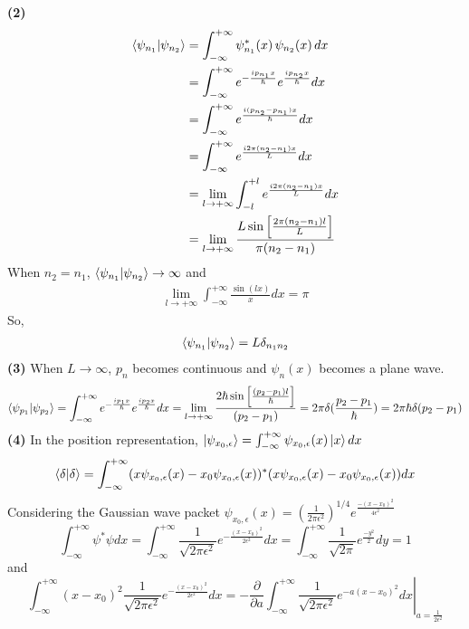 \documentclass[12pt]{article}
\begin{document}
\vspace{1em}
\textbf{(2)} 
\begin{align*}
    \braket{\psi_{n_1} | \psi_{n_2}} &= \int_{-\infty}^{+\infty} \psi_{n_1}^*(x)\, \psi_{n_2}(x) \, dx \\
    &= \int_{-\infty}^{+\infty} e^{-\frac{i p_{n_1} x}{\hbar}} e^{\frac{i p_{n_2} x}{\hbar}} dx \\
    &= \int_{-\infty}^{+\infty} e^{\frac{i (p_{n_2} - p_{n_1}) x}{\hbar}} dx \\
    &= \int_{-\infty}^{+\infty} e^{\frac{i 2\pi (n_2 - n_1)x}{L}} dx \\
    &= \lim_{l \to +\infty} \int_{-l}^{+l} e^{\frac{i 2\pi (n_2 - n_1)x}{L}} dx \\
    &= \lim_{l \to +\infty} \frac{L \sin\left[\frac{2\pi (n_2 - n_1) l}{L}\right]}{\pi (n_2 - n_1)}
\end{align*}
When $n_2 = n_1$, $\braket{\psi_{n_1} | \psi_{n_2}} \to \infty$ and
\begin{align*}
    \lim_{l \to +\infty} \int_{-\infty}^{+\infty} \frac{\sin(lx)}{x} dx = \pi
\end{align*}
So,
\begin{align*}
    \braket{\psi_{n_1} | \psi_{n_2}} = L \delta_{n_1 n_2}
\end{align*}
\textbf{(3)} 
When $L \to \infty$, $p_n$ becomes continuous and $\psi_n(x)$ becomes a plane wave.
\[
\braket{\psi_{p_1} | \psi_{p_2}} = \int_{-\infty}^{+\infty} e^{-\frac{i p_1 x}{\hbar}} e^{\frac{i p_2 x}{\hbar}} dx = \lim_{l \to +\infty} \frac{2\hbar \sin\left[\frac{(p_2 - p_1) l}{\hbar}\right]}{ (p_2 - p_1)} =  2\pi\delta(\frac{p_2 - p_1}{\hbar})=2\pi\hbar\delta(p_2-p_1)
\]
\vspace{1em}
\textbf{(4)} 
In the position representation, $\ket{\psi_{x_0,\epsilon}}=\int_{-\infty}^{+\infty}\psi_{x_0,\epsilon}(x)\ket{x}dx $ $$\braket{\delta | \delta}=\int_{-\infty}^{+\infty}(x\psi_{x_0,\epsilon}(x)-x_0 \psi_{x_0,\epsilon}(x))^{*}(x\psi_{x_0,\epsilon}(x)-x_0 \psi_{x_0,\epsilon}(x))dx$$
Considering the Gaussian wave packet $\psi_{x_0,\epsilon}(x)={(\frac{1}{{2\pi\epsilon^2}})}^{1/4}e^{\frac{-{(x-x_0)}^2}{{4\epsilon}^2}}$
\[
\int_{-\infty}^{+\infty}\psi^*\psi dx=\int_{-\infty}^{+\infty}\frac{1}{\sqrt{2\pi\epsilon^2}}e^{-\frac{(x-x_0)^2}{2\epsilon^2}}dx=\int_{-\infty}^{+\infty}\frac{1}{\sqrt{2\pi}}e^{\frac{-y^2}{2}}dy=1
\]
and 
\[
\int_{-\infty}^{+\infty}(x-x_0)^2\frac{1}{\sqrt{2\pi\epsilon^2}}e^{-\frac{(x-x_0)^2}{2\epsilon^2}}dx
= \left. -\frac{\partial}{\partial a} \int_{-\infty}^{+\infty} \frac{1}{\sqrt{2\pi\epsilon^2}} e^{-a(x-x_0)^2} dx \right|_{a = \frac{1}{2\epsilon^2}}
\]
\end{document}
